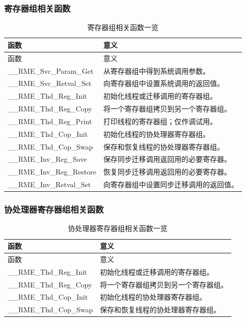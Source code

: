 \subsubsection{寄存器组相关函数}\label{subsubsec:7-register-set-functions}

\begin{xltabular}{\textwidth}{@{}>{\hsize\raggedright\arraybackslash}X>{\hsize\raggedright\arraybackslash}X@{}}
\caption{寄存器组相关函数一览}\label{tab:7-11-register-set-functions-overview}\\
\toprule
函数 & 意义\tabularnewline
\endfirsthead
\toprule
函数 & 意义\tabularnewline
\midrule
\endhead
\bottomrule
\endlastfoot
\_\_RME\_Svc\_Param\_Get & 从寄存器组中得到系统调用参数。\tabularnewline
\_\_RME\_Svc\_Retval\_Set &
向寄存器组中设置系统调用的返回值。\tabularnewline
\_\_RME\_Thd\_Reg\_Init &
初始化线程或迁移调用的寄存器组。\tabularnewline
\_\_RME\_Thd\_Reg\_Copy &
将一个寄存器组拷贝到另一个寄存器组。\tabularnewline
\_\_RME\_Thd\_Reg\_Print &
打印线程的寄存器组；仅作调试用。\tabularnewline
\_\_RME\_Thd\_Cop\_Init & 初始化线程的协处理器寄存器组。\tabularnewline
\_\_RME\_Thd\_Cop\_Swap &
保存和恢复线程的协处理器寄存器组。\tabularnewline
\_\_RME\_Inv\_Reg\_Save &
保存同步迁移调用返回用的必要寄存器。\tabularnewline
\_\_RME\_Inv\_Reg\_Restore &
恢复同步迁移调用返回用的必要寄存器。\tabularnewline
\_\_RME\_Inv\_Retval\_Set &
向寄存器组中设置同步迁移调用的返回值。\tabularnewline
\end{xltabular}

\subsubsection{协处理器寄存器组相关函数}\label{subsubsec:7-coprocessor-register-set-functions}



\begin{xltabular}{\textwidth}{@{}>{\hsize\raggedright\arraybackslash}X>{\hsize\raggedright\arraybackslash}X@{}}
\caption{协处理器寄存器组相关函数一览}\label{tab:7-12-coprocessor-register-set-functions-overview}\\
\toprule
函数 & 意义\tabularnewline
\endfirsthead
\toprule
函数 & 意义\tabularnewline
\midrule
\endhead
\bottomrule
\endlastfoot
\_\_RME\_Thd\_Reg\_Init &
初始化线程或迁移调用的寄存器组。\tabularnewline
\_\_RME\_Thd\_Reg\_Copy &
将一个寄存器组拷贝到另一个寄存器组。\tabularnewline
\_\_RME\_Thd\_Cop\_Init & 初始化线程的协处理器寄存器组。\tabularnewline
\_\_RME\_Thd\_Cop\_Swap &
保存和恢复线程的协处理器寄存器组。\tabularnewline
\end{xltabular}

